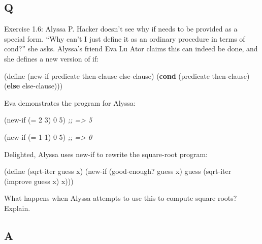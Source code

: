 \documentclass[
]{article}
\newenvironment{Shaded}{}{}
\newcommand{\CommentTok}[1]{\textcolor[rgb]{0.38,0.63,0.69}{\textit{#1}}}
\newcommand{\DecValTok}[1]{\textcolor[rgb]{0.25,0.63,0.44}{#1}}
\newcommand{\ExtensionTok}[1]{#1}
\newcommand{\FunctionTok}[1]{\textcolor[rgb]{0.02,0.16,0.49}{#1}}
\newcommand{\KeywordTok}[1]{\textcolor[rgb]{0.00,0.44,0.13}{\textbf{#1}}}
\newcommand{\NormalTok}[1]{#1}
\newcommand{\OperatorTok}[1]{\textcolor[rgb]{0.40,0.40,0.40}{#1}}
\begin{document}
\hypertarget{q-5}{%
\subsection{Q}\label{q-5}}

Exercise 1.6: Alyssa P. Hacker doesn't see why if needs to be provided
as a special form. ``Why can't I just define it as an ordinary procedure
in terms of cond?'' she asks. Alyssa's friend Eva Lu Ator claims this
can indeed be done, and she defines a new version of if:

\begin{Shaded}
\begin{Highlighting}[]
\NormalTok{(}\ExtensionTok{define}\FunctionTok{ }\NormalTok{(new{-}if predicate}
\NormalTok{                then{-}clause}
\NormalTok{                else{-}clause)}
\NormalTok{  (}\KeywordTok{cond}\NormalTok{ (predicate then{-}clause)}
\NormalTok{        (}\KeywordTok{else}\NormalTok{ else{-}clause)))}
\end{Highlighting}
\end{Shaded}

Eva demonstrates the program for Alyssa:

\begin{Shaded}
\begin{Highlighting}[]
\NormalTok{(new{-}if (}\OperatorTok{=} \DecValTok{2} \DecValTok{3}\NormalTok{) }\DecValTok{0} \DecValTok{5}\NormalTok{)}
\CommentTok{;; =\textgreater{} 5}

\NormalTok{(new{-}if (}\OperatorTok{=} \DecValTok{1} \DecValTok{1}\NormalTok{) }\DecValTok{0} \DecValTok{5}\NormalTok{)}
\CommentTok{;; =\textgreater{} 0}
\end{Highlighting}
\end{Shaded}

Delighted, Alyssa uses new-if to rewrite the square-root program:

\begin{Shaded}
\begin{Highlighting}[]
\NormalTok{(}\ExtensionTok{define}\FunctionTok{ }\NormalTok{(sqrt{-}iter guess x)}
\NormalTok{  (new{-}if (good{-}enough? guess x)}
\NormalTok{          guess}
\NormalTok{          (sqrt{-}iter (improve guess x) x)))}
\end{Highlighting}
\end{Shaded}

What happens when Alyssa attempts to use this to compute square roots?
Explain.

\hypertarget{a-5}{%
\subsection{A}\label{a-5}}
\end{document}
